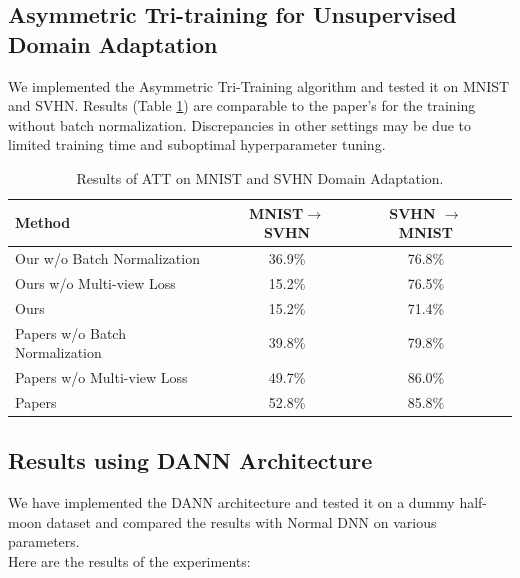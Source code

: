 \documentclass{article}
\begin{document}
\subsection{Asymmetric Tri-training for Unsupervised Domain Adaptation}
We implemented the Asymmetric Tri-Training algorithm and tested it on MNIST and SVHN. Results (Table \ref{tab:att_results}) are comparable to the paper's for the training without batch normalization. Discrepancies in other settings may be due to limited training time and suboptimal hyperparameter tuning.
\begin{table}
  \centering
  \caption{Results of ATT on MNIST and SVHN Domain Adaptation.}
  \label{tab:att_results}
  \begin{tabular}{lccc}
      \toprule
      \textbf{Method} & \textbf{MNIST\(\to\)SVHN} & \textbf{SVHN \(\to\) MNIST} \\
      \midrule
      Our w/o Batch Normalization & 36.9\% & 76.8\% \\
      Ours w/o Multi-view Loss & 15.2\% & 76.5\% \\
      Ours  & 15.2\% & 71.4\% \\
      \midrule
      Papers w/o Batch Normalization & 39.8\% & 79.8\% \\
      Papers w/o Multi-view Loss & 49.7\% & 86.0\% \\
      Papers  & 52.8\% & 85.8\% \\
      \bottomrule
  \end{tabular}
\end{table}

\subsection{Results using DANN Architecture}
We have implemented the DANN architecture and tested it on a dummy half- moon dataset and compared the results with Normal DNN on various parameters.\\
Here are the results of the experiments:
\footnotesize
\centering
\end{document}
